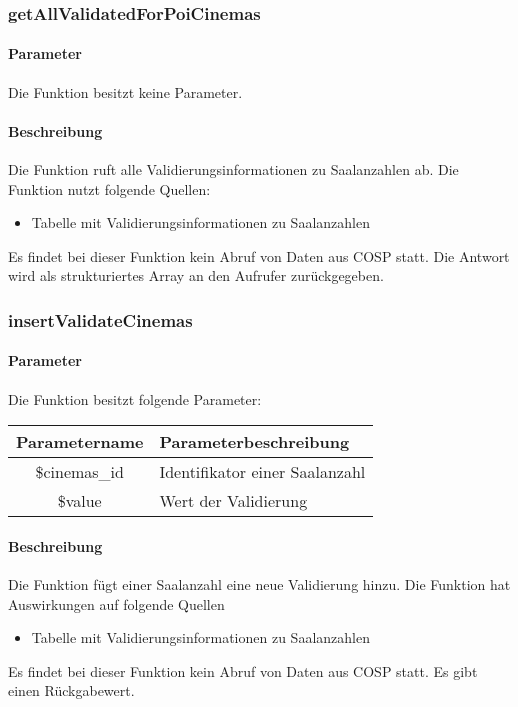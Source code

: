 \subsubsection{getAllValidatedForPoiCinemas}
\paragraph{Parameter} Die Funktion besitzt keine Parameter.
\paragraph{Beschreibung} Die Funktion ruft alle Validierungsinformationen zu Saalanzahlen ab. Die Funktion nutzt folgende Quellen:
\begin{itemize}
	\item Tabelle mit Validierungsinformationen zu Saalanzahlen
\end{itemize}
Es findet bei dieser Funktion kein Abruf von Daten aus {\glqq COSP\grqq} statt. Die Antwort wird als strukturiertes Array an den Aufrufer zurückgegeben.
\subsubsection{insertValidateCinemas}
\paragraph{Parameter} Die Funktion besitzt folgende Parameter:
\begin{table}[H]
	\begin{tabular}{|c|p{11cm}|}
		\hline
		\textbf{Parametername} & \textbf{Parameterbeschreibung} \\ \hline
		\$cinemas\_id & Identifikator einer Saalanzahl \\ \hline
		\$value       & Wert der Validierung \\ \hline
	\end{tabular}
\end{table}
\paragraph{Beschreibung} Die Funktion fügt einer Saalanzahl eine neue Validierung hinzu. Die Funktion hat Auswirkungen auf folgende Quellen
\begin{itemize}
	\item Tabelle mit Validierungsinformationen zu Saalanzahlen
\end{itemize}
Es findet bei dieser Funktion kein Abruf von Daten aus {\glqq COSP\grqq} statt. Es gibt einen Rückgabewert.
